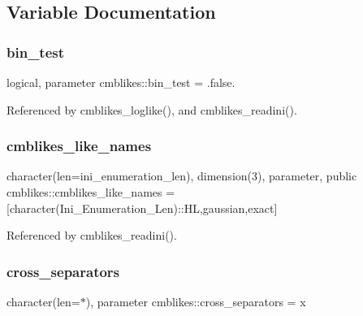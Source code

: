 \subsection{Variable Documentation}
\mbox{\label{namespacecmblikes_a109d8823809382a8545c68b8598c8a06}} 
\subsubsection{\texorpdfstring{bin\+\_\+test}{bin\_test}}
{\footnotesize\ttfamily logical, parameter cmblikes\+::bin\+\_\+test = .false.\hspace{0.3cm}{\ttfamily [private]}}



Referenced by cmblikes\+\_\+loglike(), and cmblikes\+\_\+readini().

\mbox{\label{namespacecmblikes_abc590f6fd0bd85c7afe4fed208f61b3e}} 
\subsubsection{\texorpdfstring{cmblikes\+\_\+like\+\_\+names}{cmblikes\_like\_names}}
{\footnotesize\ttfamily character(len=ini\+\_\+enumeration\+\_\+len), dimension(3), parameter, public cmblikes\+::cmblikes\+\_\+like\+\_\+names = \mbox{[}character(Ini\+\_\+\+Enumeration\+\_\+\+Len)\+::\textquotesingle{}HL\textquotesingle{},\textquotesingle{}gaussian\textquotesingle{},\textquotesingle{}exact\textquotesingle{}\mbox{]}}



Referenced by cmblikes\+\_\+readini().

\mbox{\label{namespacecmblikes_a55c986dc536bdd0894cd5bf2fb584f70}} 
\subsubsection{\texorpdfstring{cross\+\_\+separators}{cross\_separators}}
{\footnotesize\ttfamily character(len=$\ast$), parameter cmblikes\+::cross\+\_\+separators = \textquotesingle{}x\textquotesingle{}\hspace{0.3cm}{\ttfamily [private]}}



